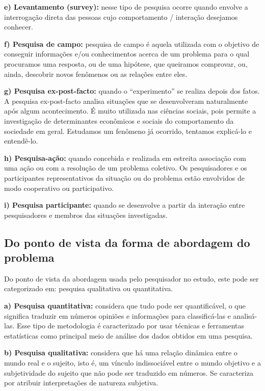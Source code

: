 \textbf{e) Levantamento (survey):} nesse tipo de pesquisa ocorre quando envolve a interrogação direta das pessoas cujo comportamento / interação desejamos conhecer.

\textbf{f) Pesquisa de campo:} pesquisa de campo é aquela utilizada com o objetivo de conseguir informações e/ou conhecimentos acerca de um problema para o qual procuramos uma resposta, ou de uma hipótese, que queiramos comprovar, ou, ainda, descobrir novos fenômenos ou as relações entre eles.

\textbf{g) Pesquisa ex-post-facto:} quando o “experimento” se realiza depois dos fatos. A pesquisa ex-post-facto analisa situações que se desenvolveram naturalmente após algum acontecimento. É muito utilizada nas ciências sociais, pois permite a investigação de determinantes econômicos e sociais do comportamento da sociedade em geral. Estudamos um fenômeno já ocorrido, tentamos explicá-lo e entendê-lo.

\textbf{h) Pesquisa-ação:} quando concebida e realizada em estreita associação com uma ação ou com a resolução de um problema coletivo. Os pesquisadores e os participantes representativos da situação ou do problema estão envolvidos de modo cooperativo ou participativo.

\textbf{i) Pesquisa participante:} quando se desenvolve a partir da interação entre pesquisadores e membros das situações investigadas.

\subsection{Do ponto de vista da forma de abordagem do problema}

Do ponto de vista da abordagem usada pelo pesquisador no estudo, este pode ser categorizado em: pesquisa qualitativa ou quantitativa\cite{de2013metodologia}.

\textbf{a) Pesquisa quantitativa:} considera que tudo pode ser quantificável, o que significa traduzir em números opiniões e informações para classificá-las e analisá-las. Esse tipo de metodologia é caracterizado por usar técnicas e ferramentas estatísticas como principal meio de análise dos dados obtidos em uma pesquisa. 

\textbf{b) Pesquisa qualitativa:} considera que há uma relação dinâmica entre o mundo real e o sujeito, isto é, um vínculo indissociável entre o mundo objetivo e a subjetividade do sujeito que não pode ser traduzido em números. Se caracteriza por atribuir interpretações de natureza subjetiva. 

